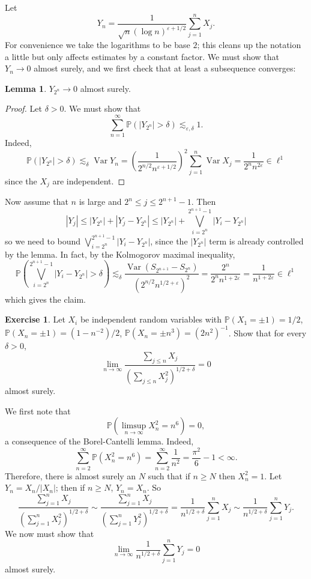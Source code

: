 \documentclass[10pt]{article}
\newcommand{\PP}{\mathbb P}
\newcommand{\Var}{\operatorname{Var}}
\theoremstyle{definition}
\newtheorem{exer}{Exercise}
\newtheorem{lemma}{Lemma}[exer]
\begin{document}
Let
$$Y_n = \frac{1}{\sqrt n (\log n)^{\varepsilon + 1/2}} \sum_{j=1}^n X_j.$$
For convenience we take the logarithms to be base $2$; this cleans up the notation a little but only affects estimates by a constant factor.
We must show that $Y_n \to 0$ almost surely, and we first check that at least a subsequence converges:
\begin{lemma}
$Y_{2^n} \to 0$ almost surely.
\end{lemma}
\begin{proof}
Let $\delta > 0$. We must show that
$$\sum_{n=1}^\infty \PP(|Y_{2^n}| > \delta) \lesssim_{\varepsilon,\delta} 1.$$
Indeed,
$$\PP(|Y_{2^n}| > \delta) \lesssim_\delta \Var Y_n = \left(\frac{1}{2^{n/2}n^{\varepsilon+1/2}}\right)^2 \sum_{j=1}^n \Var X_j = \frac{1}{2^n n^{2\varepsilon}} \in \ell^1$$
since the $X_j$ are independent.
\end{proof}
Now assume that $n$ is large and $2^n \leq j \leq 2^{n+1} - 1$. Then
$$|Y_j| \leq |Y_{2^n}| + |Y_j - Y_{2^n}| \leq |Y_{2^n}| + \bigvee_{i=2^n}^{2^{n+1} - 1} |Y_i - Y_{2^n}|$$
so we need to bound $\bigvee_{i=2^n}^{2^{n+1} - 1} |Y_i - Y_{2^n}|$, since the $|Y_{2^n}|$ term is already controlled by the lemma.
In fact, by the Kolmogorov maximal inequality,
$$\PP\left(\bigvee_{i=2^n}^{2^{n+1} - 1} |Y_i - Y_{2^n}| > \delta\right) \lesssim_\delta \frac{\Var(S_{2^{n+1}} - S_{2^n})}{(2^{n/2}n^{1/2+\varepsilon})^2} = \frac{2^n}{2^n n^{1+2\varepsilon}} = \frac{1}{n^{1+2\varepsilon}} \in \ell^1$$
which gives the claim.

\begin{exer}
Let $X_i$ be independent random variables with $\PP(X_1 = \pm 1) = 1/2$, $\PP(X_n = \pm 1) = (1 - n^{-2})/2$, $\PP(X_n = \pm n^3) = (2n^2)^{-1}$.
Show that for every $\delta > 0$,
$$\lim_{n \to \infty} \frac{\sum_{j \leq n} X_j}{(\sum_{j \leq n} X_j^2)^{1/2 + \delta}} = 0$$
almost surely.
\end{exer}

We first note that
$$\PP\left(\limsup_{n \to \infty} X_n^2 = n^6\right) = 0,$$
a consequence of the Borel-Cantelli lemma. Indeed,
$$\sum_{n=2}^\infty \PP(X_n^2 = n^6) = \sum_{n=2}^\infty \frac{1}{n^2} = \frac{\pi^2}{6} - 1 < \infty.$$
Therefore, there is almost surely an $N$ such that if $n \geq N$ then $X_n^2 = 1$.
Let $Y_n = X_n/|X_n|$; then if $n \geq N$, $Y_n = X_n$. So
$$\frac{\sum_{j=1}^n X_j}{(\sum_{j=1}^n X_j^2)^{1/2+\delta}} \sim \frac{\sum_{j=1}^n X_j}{(\sum_{j=1}^n Y_j^2)^{1/2 + \delta}} = \frac{1}{n^{1/2+\delta}} \sum_{j=1}^n X_j
\sim \frac{1}{n^{1/2+\delta}} \sum_{j=1}^n Y_j.$$
We now must show that
$$\lim_{n \to \infty} \frac{1}{n^{1/2+\delta}} \sum_{j=1}^n Y_j = 0$$
almost surely.
\end{document}
